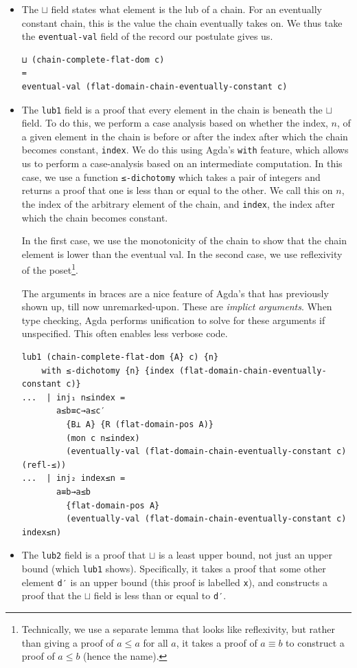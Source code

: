 \documentclass[12pt,a4paper,twoside,openright]{report}
\begin{document}
\begin{itemize}
\item The $\sqcup$ field states what element is the lub of a chain. For an eventually constant chain, this is the value the chain eventually takes on. We thus take the \texttt{eventual-val} field of the record our postulate gives us. 
\begin{verbatim}
⊔ (chain-complete-flat-dom c) 
= 
eventual-val (flat-domain-chain-eventually-constant c)
\end{verbatim}
\item The \texttt{lub1} field is a proof that every element in the chain is beneath the $\sqcup$ field. To do this, we perform a case analysis based on whether the index, $n$, of a given element in the chain is before or after the index after which the chain becomes constant, \texttt{index}. We do this using Agda's \texttt{with} feature, which allows us to perform a case-analysis based on an intermediate computation. In this case, we use a function \texttt{≤-dichotomy} which takes a pair of integers and returns a proof that one is less than or equal to the other. We call this on $n$, the index of the arbitrary element of the chain, and \texttt{index}, the index after which the chain becomes constant. 

In the first case, we use the monotonicity of the chain to show that the chain element is lower than the eventual val. In the second case, we use reflexivity of the poset\footnote{Technically, we use a separate lemma that looks like reflexivity, but rather than giving a proof of $a \leq a$ for all $a$, it takes a proof of $a \equiv b$ to construct a proof of $a \leq b$ (hence the name).}.

The arguments in braces are a nice feature of Agda's that has previously shown up, till now unremarked-upon. These are \textit{implict arguments}. When type checking, Agda performs unification to solve for these arguments if unspecified. This often enables less verbose code.
\begin{verbatim}
lub1 (chain-complete-flat-dom {A} c) {n} 
    with ≤-dichotomy {n} {index (flat-domain-chain-eventually-constant c)}
...  | inj₁ n≤index = 
       a≤b≡c→a≤c′
         {B⊥ A} {R (flat-domain-pos A)}
         (mon c n≤index)
         (eventually-val (flat-domain-chain-eventually-constant c) (refl-≤))
...  | inj₂ index≤n = 
       a≡b→a≤b
         {flat-domain-pos A}
         (eventually-val (flat-domain-chain-eventually-constant c) index≤n)
\end{verbatim}
\item
The \texttt{lub2} field is a proof that $\sqcup$ is a least upper bound, not just an upper bound (which \texttt{lub1} shows). Specifically, it takes a proof that some other element \texttt{d′} is an upper bound (this proof is labelled \texttt{x}), and constructs a proof that the $\sqcup$ field is less than or equal to \texttt{d′}.


\end{itemize}
\end{document}

